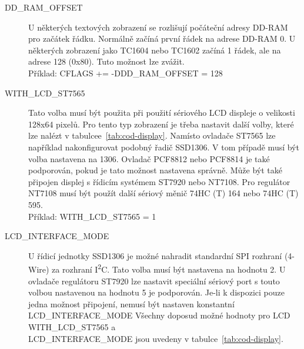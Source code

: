 \begin{description}
  \item[DD\_RAM\_OFFSET] U některých textových zobrazení se rozlišují počáteční adresy DD-RAM pro začátek řádku. Normálně začíná první řádek na adrese DD-RAM 0.
U některých zobrazení jako TC1604 nebo TC1602 začíná 1 řádek, ale na adrese 128 (0x80).
Tuto možnost lze zvážit.\\
Příklad: CFLAGS += -DDD\_RAM\_OFFSET = 128

  \item[WITH\_LCD\_ST7565] Tato volba musí být použita při použití sériového LCD displeje o velikosti 128x64 pixelů.
Pro tento typ zobrazení je třeba nastavit další volby, které lze nalézt v tabulcee~\ref{tab:cod-display}.
Namísto ovladače ST7565 lze například nakonfigurovat podobný řadič SSD1306.
V tom případě musí být volba nastavena na 1306.
Ovladač PCF8812 nebo PCF8814 je také podporován, pokud je tato možnost nastavena správně.
Může být také připojen displej s řídicím systémem ST7920 nebo NT7108.
Pro regulátor NT7108 musí být použít další sériový měnič 74HC (T) 164 nebo 74HC (T) 595.\\
Příklad: WITH\_LCD\_ST7565 = 1 

 \item[LCD\_INTERFACE\_MODE] U řídicí jednotky SSD1306 je možné nahradit standardní 
SPI rozhraní (4-Wire) za rozhraní I\textsuperscript{2}C.
Tato volba musí být nastavena na hodnotu 2.
U ovladače regulátoru ST7920 lze nastavit speciální sériový port s touto volbou nastavenou
na hodnotu 5 je podporován.
Je-li k dispozici pouze jedna možnost připojení, nemusí být nastaven konstantní LCD\_INTERFACE\_MODE 
Všechny doposud možné hodnoty pro LCD \\ WITH\_LCD\_ST7565 a\\ LCD\_INTERFACE\_MODE jsou
uvedeny v tabulce~\ref{tab:cod-display}.


\end{description}

